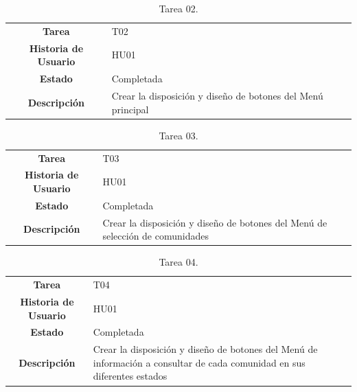 \begin{table}[H]
	\begin{center}
		\begin{tabular}{| c | p{9cm} |}
			\hline
			
			\textbf{Tarea} & T02 \\
			\textbf{Historia de Usuario} & HU01 \\
			\textbf{Estado} & Completada \\
			\textbf{Descripción} & Crear la disposición y diseño de botones del Menú principal \\ \hline
		\end{tabular}
		\caption{Tarea 02.}
	\end{center}
\end{table}

\begin{table}[H]
	\begin{center}
		\begin{tabular}{| c | p{9cm} |}
			\hline
			
			\textbf{Tarea} & T03 \\
			\textbf{Historia de Usuario} & HU01 \\
			\textbf{Estado} & Completada \\
			\textbf{Descripción} & Crear la disposición y diseño de botones del Menú de selección de comunidades \\ \hline
		\end{tabular}
		\caption{Tarea 03.}
	\end{center}
\end{table}

\begin{table}[H]
	\begin{center}
		\begin{tabular}{| c | p{9cm} |}
			\hline
			
			\textbf{Tarea} & T04 \\
			\textbf{Historia de Usuario} & HU01 \\
			\textbf{Estado} & Completada \\
			\textbf{Descripción} & Crear la disposición y diseño de botones del Menú de información a consultar de cada comunidad en sus diferentes estados \\ \hline
		\end{tabular}
		\caption{Tarea 04.}
	\end{center}
\end{table}

